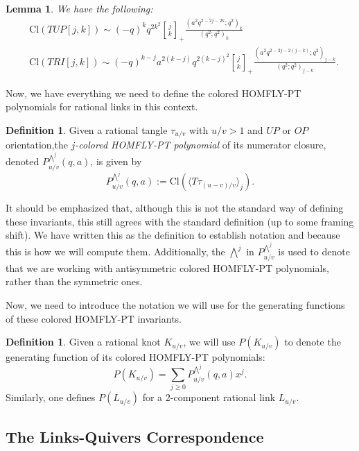 \documentclass[11pt]{amsart}
\theoremstyle{plain}
\newtheorem{lemmaN}[theoremN]{Lemma}
\theoremstyle{definition}
\newtheorem{definitionN}[theoremN]{Definition}
\theoremstyle{remark}
\begin{document}
\begin{lemmaN}
\label{WSclosureformulas}
We have the following:
    \begin{align}
    &\text{Cl}(TUP[j,k])\sim (-q)^kq^{2k^2}{j\brack k}_+\frac{(a^2q^{2-2j-2k};q^2)_k}{(q^2;q^2)_k}\\
    &\text{Cl}(TRI[j,k])\sim (-q)^{k-j}a^{2(k-j)}q^{2(k-j)^2}{j \brack k}_+ \frac{(a^2q^{2-2j-2(j-k)};q^2)_{j-k}}{(q^2;q^2)_{j-k}}.
    \end{align}    
\end{lemmaN}

Now, we have everything we need to define the colored HOMFLY-PT polynomials for rational links in this context.

\begin{definitionN}
    Given a rational tangle $\tau_{u/v}$ with $u/v>1$ and $UP$ or $OP$ orientation,the \textit{$j$-colored HOMFLY-PT polynomial} of its numerator closure, denoted $P_{u/v}^{\bigwedge^j}(q,a)$, is given by
    \[
    P_{u/v}^{\bigwedge^j}(q,a):=\text{Cl}(\langle T\tau_{(u-v)/v}\rangle_j).
    \]
\end{definitionN}

It should be emphasized that, although this is not the standard way of defining these invariants, this still agrees with the standard definition (up to some framing shift). We have written this as the definition to establish notation and because this is how we will compute them. Additionally, the $\bigwedge^j$ in $P_{u/v}^{\bigwedge^j}$ is used to denote that we are working with antisymmetric colored HOMFLY-PT polynomials, rather than the symmetric ones. 

Now, we need to introduce the notation we will use for the generating functions of these colored HOMFLY-PT invariants.

\begin{definitionN}
    Given a rational knot $K_{u/v}$, we will use $P(K_{u/v})$ to denote the generating function of its colored HOMFLY-PT polynomials:
    \[
    P(K_{u/v})=\sum_{j\geq 0} P_{u/v}^{\bigwedge^j}(q,a)x^j.
    \]
    Similarly, one defines $P(L_{u/v})$ for a 2-component rational link $L_{u/v}$.
\end{definitionN}

\subsection{The Links-Quivers Correspondence}
\label{LQCsec}
\end{document}
